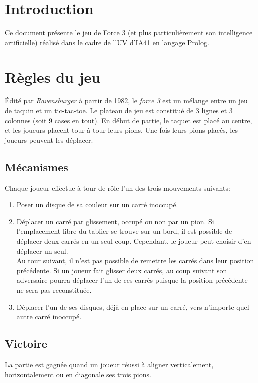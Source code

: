 \documentclass[a4paper,12pt]{article}
\begin{document}
\tableofcontents
\newpage

\section*{Introduction}
Ce document présente le jeu de Force 3 (et plus particulièrement son intelligence artificielle) réalisé dans le cadre de l'UV d'IA41 en langage Prolog.

\section{Règles du jeu}
Édité par \emph{Ravensburger} à partir de 1982, le \emph{force 3} est un mélange entre un jeu de taquin et un tic-tac-toe. Le plateau de jeu est constitué de 3 lignes et 3 colonnes (soit 9 cases en tout). En début de partie, le taquet est placé au centre, et les joueurs placent tour à tour leurs pions. Une fois leurs pions placés, les joueurs peuvent les déplacer.

\subsection{Mécanismes}
Chaque joueur effectue à tour de rôle l'un des trois mouvements suivants:
\begin{enumerate}
	\item Poser un disque de sa couleur sur un carré inoccupé.
	\item Déplacer un carré par glissement, occupé ou non par un pion. Si l'emplacement libre du tablier se trouve sur un bord, il est possible de déplacer deux carrés en un seul coup. Cependant, le joueur peut choisir d'en déplacer un seul.\\
	 Au tour suivant, il n'est pas possible de remettre les carrés dans leur position précédente. Si un joueur fait glisser deux carrés, au coup suivant son adversaire pourra déplacer l'un de ces carrés puisque la position précédente ne sera pas reconstituée.
    \item Déplacer l'un de ses disques, déjà en place sur un carré, vers n'importe quel autre carré inoccupé.
\end{enumerate}
    
\subsection{Victoire}
La partie est gagnée quand un joueur réussi à aligner verticalement, horizontalement ou en diagonale ses trois pions.
\clearpage
\end{document}
